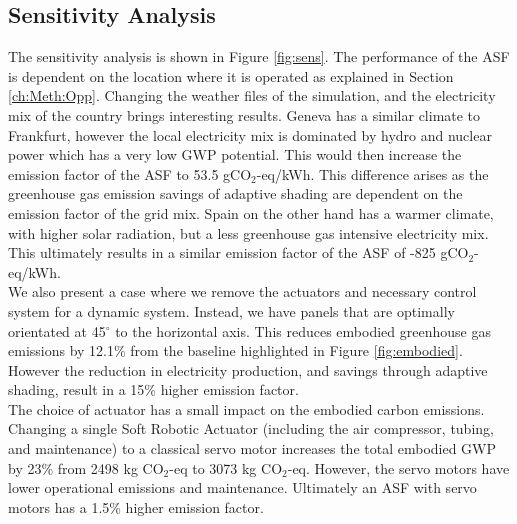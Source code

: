 
\subsection{Sensitivity Analysis}


The sensitivity analysis is shown in Figure \ref{fig:sens}. The performance of the ASF is dependent on the location where it is operated as explained in Section \ref{ch:Meth:Opp}. Changing the weather files of the simulation, and the electricity mix of the country brings interesting results. Geneva has a similar climate to Frankfurt, however the local electricity mix is dominated by hydro and nuclear power which has a very low GWP potential\cite{itten2012life}. This would then increase the emission factor of the ASF to 53.5 gCO$_{2}$-eq/kWh. This difference arises as the greenhouse gas emission savings of adaptive shading are dependent on the emission factor of the grid mix.
Spain on the other hand has a warmer climate, with higher solar radiation, but a less greenhouse gas intensive electricity mix. This ultimately results in a similar emission factor of the ASF of -825 gCO$_{2}$-eq/kWh.\\


We also present a case where we remove the actuators and necessary control system for a dynamic system. Instead, we have panels that are optimally orientated at 45$^{\circ}$ to the horizontal axis. This reduces embodied greenhouse gas emissions by 12.1\% from the baseline highlighted in Figure \ref{fig:embodied}. However the reduction in electricity production, and savings through adaptive shading, result in a 15\% higher emission factor.\\

The choice of actuator has a small impact on the embodied carbon emissions. Changing a single Soft Robotic Actuator (including the air compressor, tubing, and maintenance) to a classical servo motor increases the total embodied GWP by 23\% from 2498 kg CO$_{2}$-eq to 3073 kg CO$_{2}$-eq. However, the servo motors have lower operational emissions and maintenance. Ultimately an ASF with servo motors has a 1.5\% higher emission factor. \\

